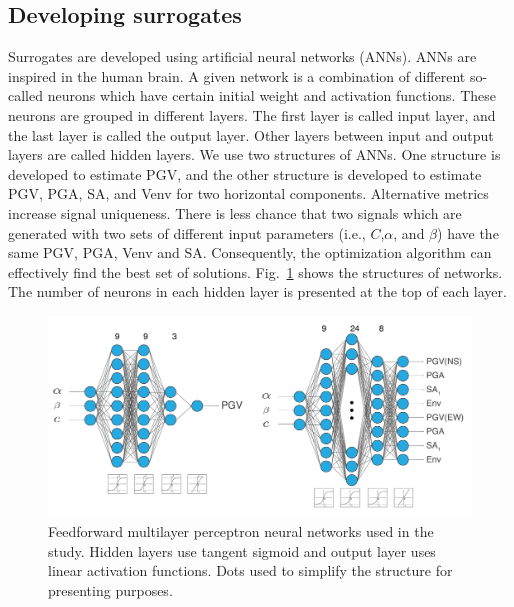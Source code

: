 \subsection{Developing surrogates} 

Surrogates are developed using artificial neural networks (ANNs). ANNs are inspired in the human brain. A given network is a combination of different so-called neurons which have certain initial weight and activation functions. These neurons are grouped in different layers. The first layer is called input layer, and the last layer is called the output layer. Other layers between input and output layers are called hidden layers. We use two structures of ANNs.  One structure is developed to estimate PGV, and the other structure is developed to estimate PGV, PGA, SA, and Venv for two horizontal components. Alternative metrics increase signal uniqueness. There is less chance that two signals which are generated with two sets of different input parameters (i.e., $C$,$\alpha$, and $\beta$) have the same PGV, PGA, Venv and SA. Consequently, the optimization algorithm can effectively find the best set of solutions. Fig.~\ref{fig:Figure_ann_structure} shows the structures of networks. The number of neurons in each hidden layer is presented at the top of each layer.

 \begin{figure}
    \centering
    \includegraphics[width=1\textwidth]{figures/pdf/Figure_03.pdf}
    \caption{Feedforward multilayer perceptron neural networks used in the study. Hidden layers use tangent sigmoid and output layer uses linear activation functions. Dots used to simplify the structure for presenting purposes.}
    \label{fig:Figure_ann_structure}
\end{figure}

